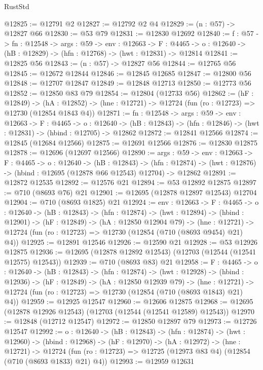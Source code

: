 \begin{lexlean}{RustStd}
\begin{coremodule}
@12825 := @12791 @2
@12827 := @12792 @2 @4
@12829 := (n : @57) -> @12827 @66
@12830 := @53 @79
@12831 := @12830 @12692
@12840 := {f : @57} ->
  {fn : @12548} ->
  {args : @59} ->
  {env : @12663} ->
  {F : @4465} -> {o : @12640} -> (hB : @12829) -> (hfn : @12768) -> (hwt : @12831) -> @12814
@12841 := @12825 @56
@12843 := (n : @57) -> @12827 @56
@12844 := @12765 @56
@12845 := @12672 @12844
@12846 := @12845 @12685
@12847 := @12800 @56
@12848 := @12707 @12847
@12849 := @12848 @12713
@12850 := @12773 @56
@12852 := @12850 @83 @79
@12854 := @12804 (@12733 @56)
@12862 := (hF : @12849) ->
  (hA : @12852) -> (hne : @12721) -> @12724 (fun (ro : @12723) => @12730 (@12854 @1843 @4))
@12871 := {fn : @12548} ->
  {args : @59} ->
  {env : @12663} ->
  {F : @4465} ->
  {o : @12640} -> (hB : @12843) -> (hfn : @12846) -> (hwt : @12831) -> (hbind : @12705) -> @12862
@12872 := @12841 @12566
@12874 := @12845 (@12684 @12566)
@12875 := @12691 @12566
@12876 := @12830 @12875
@12878 := @12696 (@12697 @12566)
@12890 := {args : @59} ->
  {env : @12663} ->
  {F : @4465} ->
  {o : @12640} ->
  (hB : @12843) ->
  (hfn : @12874) -> (hwt : @12876) -> (hbind : @12695 (@12878 @66 @12543) @12704) -> @12862
@12891 := @12872 @12535
@12892 := @12576 @21
@12894 := @53 @12892 @12875
@12897 := @710 (@8693 @76) @21
@12901 := @12695 (@12878 @12897 @12543) @12704
@12904 := @710 (@8693 @1825) @21
@12924 := {env : @12663} ->
  {F : @4465} ->
  {o : @12640} ->
  (hB : @12843) ->
  (hfn : @12874) ->
  (hwt : @12894) ->
  (hbind : @12901) ->
  (hF : @12849) ->
  (hA : @12850 @12904 @79) ->
  (hne : @12721) -> @12724 (fun (ro : @12723) => @12730 (@12854 (@710 (@8693 @9454) @21) @4))
@12925 := @12891 @12546
@12926 := @12590 @21
@12928 := @53 @12926 @12875
@12936 := @12695 (@12878 @12892 @12543) (@12703 (@12544 (@12541 @12575) @12543))
@12939 := @710 (@8693 @83) @21
@12958 := {F : @4465} ->
  {o : @12640} ->
  (hB : @12843) ->
  (hfn : @12874) ->
  (hwt : @12928) ->
  (hbind : @12936) ->
  (hF : @12849) ->
  (hA : @12850 @12939 @79) ->
  (hne : @12721) -> @12724 (fun (ro : @12723) => @12730 (@12854 (@710 (@8693 @1843) @21) @4))
@12959 := @12925 @12547
@12960 := @12606 @12875
@12968 := @12695 (@12878 @12926 @12543) (@12703 (@12544 (@12541 @12589) @12543))
@12970 := @12848 (@12712 @12547)
@12972 := @12850 @12897 @79
@12973 := @12726 @12547
@12992 := {o : @12640} ->
  (hB : @12843) ->
  (hfn : @12874) ->
  (hwt : @12960) ->
  (hbind : @12968) ->
  (hF : @12970) ->
  (hA : @12972) ->
  (hne : @12721) ->
  @12724 (fun (ro : @12723) => @12725 (@12973 @83 @4) (@12854 (@710 (@8693 @1833) @21) @4))
@12993 := @12959 @12631

\end{coremodule}
\end{lexlean}
